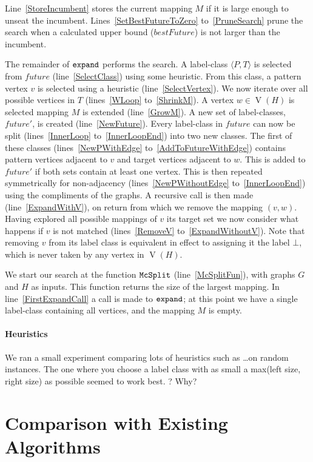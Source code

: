 \documentclass[letterpaper]{article}
\newcommand{\AlgVar}[1]{\mathit{#1}}
\newcommand{\lineref}[1]{line~\ref{#1}}
\newcommand{\linerangeref}[2]{lines~\ref{#1} to~\ref{#2}}
\newcommand{\Lineref}[1]{Line~\ref{#1}}
\newcommand{\Linerangeref}[2]{Lines~\ref{#1} to~\ref{#2}}
\DeclareMathOperator{\V}{V}
\begin{document}
\Lineref{StoreIncumbent} stores the current mapping $M$ if it is large enough
to unseat the incumbent.  \Linerangeref{SetBestFutureToZero}{PruneSearch} prune
the search when a calculated upper bound ($\AlgVar{bestFuture}$) is not larger
than the incumbent.

The remainder of $\FuncSty{expand}$ performs the search.  A label-class
$\langle P, T \rangle$ is selected from $\AlgVar{future}$
(\lineref{SelectClass}) using some heuristic.  From this class, a pattern
vertex $v$ is selected using a heuristic (\lineref{SelectVertex}). We now
iterate over all possible vertices in $T$ (\linerangeref{WLoop}{ShrinkM}). A
vertex $w \in \V(H)$ is selected mapping $M$ is extended (\lineref{GrowM}). A
new set of label-classes, $\AlgVar{future'}$, is created (\lineref{NewFuture}).
Every label-class in $\AlgVar{future}$ can now be split
(\linerangeref{InnerLoop}{InnerLoopEnd}) into two new classes. The first of
these classes (\linerangeref{NewPWithEdge}{AddToFutureWithEdge}) contains
pattern vertices adjacent to $v$ and target vertices adjacent to $w$.  This is
added to $\AlgVar{future'}$ if both sets contain at least one vertex.  This is
then repeated symmetrically for non-adjacency
(\linerangeref{NewPWithoutEdge}{InnerLoopEnd}) using the compliments of the
graphs.  A recursive call is then made (\lineref{ExpandWithV}), on return from
which we remove the mapping $(v,w)$.  Having explored all possible mappings of
$v$ its target set we now consider what happens if $v$ is not matched
(\linerangeref{RemoveV}{ExpandWithoutV}). Note that removing $v$ from its label
class is equivalent in effect to assigning it the label $\bot$, which is never
taken by any vertex in $\V(H)$.

We start our search at the function $\FuncSty{McSplit}$ (\lineref{McSplitFun}),
with graphs $G$ and $H$ as inputs.  This function returns the size of the
largest mapping.  In \lineref{FirstExpandCall} a call is made to
$\FuncSty{expand}$; at this point we have a single label-class containing all
vertices, and the mapping $M$ is empty.

\paragraph{Heuristics} We ran a small experiment comparing lots of heuristics
such as \dots on random instances. The one where you choose a label class with
as small a max(left size, right size) as possible seemed to work best. ? Why?

\section{Comparison with Existing Algorithms}\label{sec:comparison}
\end{document}
